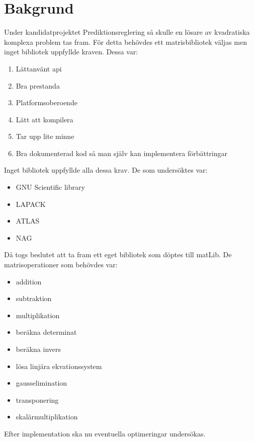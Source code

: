 \section{Bakgrund}
Under kandidatprojektet Prediktionsreglering så skulle en lösare av kvadratiska komplexa problem tas fram. För detta behövdes ett matrisbibliotek väljas men inget bibliotek uppfyllde kraven. Dessa var:
\begin{enumerate}

\item Lättanvänt api
\item Bra prestanda
\item Platformsoberoende
\item Lätt att kompilera
\item Tar upp lite minne
\item Bra dokumenterad kod så man själv kan implementera förbättringar

\end{enumerate} 

Inget bibliotek uppfyllde alla dessa krav. De som undersöktes var:
\begin{itemize}

\item GNU Scientific library
\item LAPACK
\item ATLAS
\item NAG

\end{itemize}
Då togs beslutet att ta fram ett eget bibliotek som döptes till matLib. De matrisoperationer som behövdes var:
\begin{itemize}

\item addition
\item subtraktion
\item multiplikation
\item beräkna determinat
\item beräkna invers
\item lösa linjära ekvationssystem
\item gausselimination
\item transponering
\item skalärmultiplikation

\end{itemize}
Efter implementation ska nu eventuella optimeringar undersökas. 

